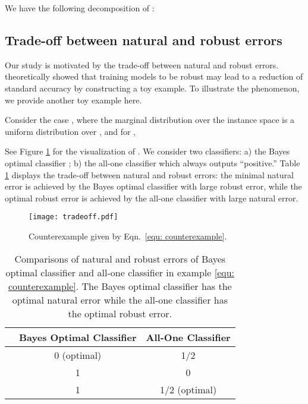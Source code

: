 \documentclass[11pt]{article}
\newcommand{\0}{\mathbf{0}}
\newcommand{\1}{\mathbf{1}}
\begin{document}
We have the following decomposition of :



\subsection{Trade-off between natural and robust errors}
\label{section: trade-off between natural and robust errors}

Our study is motivated by the trade-off between natural and robust errors.
\cite{tsipras2018robustness} theoretically showed that training models to be robust may lead to a reduction of standard accuracy by constructing a toy example. To illustrate the phenomenon, we provide another toy example here.

\medskip
{}
Consider the case , where the marginal distribution over the instance space is a uniform distribution over , and for ,

See Figure \ref{figure: tradeoff} for the visualization of . We consider two classifiers: a) the Bayes optimal classifier ; b) the all-one classifier which always outputs ``positive.'' Table \ref{table: comparison of error} displays the trade-off between natural and robust errors: the minimal natural error is achieved by the Bayes optimal classifier with large robust error, while the optimal robust error is achieved by the all-one classifier with large natural error. 




\begin{figure}
\centering
\texttt{[image: tradeoff.pdf]}
\caption{Counterexample given by Eqn.~\eqref{equ: counterexample}.}
\label{figure: tradeoff}
\end{figure}

\begin{table}
\caption{Comparisons of natural and robust errors of Bayes optimal classifier and all-one classifier in example \eqref{equ: counterexample}. The Bayes optimal classifier has the optimal natural error while the all-one classifier has the optimal robust error.}
\label{table: comparison of error}
\centering
\begin{tabular}{c|c|c}\hline
& Bayes Optimal Classifier & All-One Classifier
\\
\hline
 & 0 (optimal) & 1/2\\
\hline
 & 1 & 0 \\
\hline
 & 1 & 1/2 (optimal)\\
\hline
\end{tabular}
\vspace{-0.4cm}
\end{table}
\end{document}
